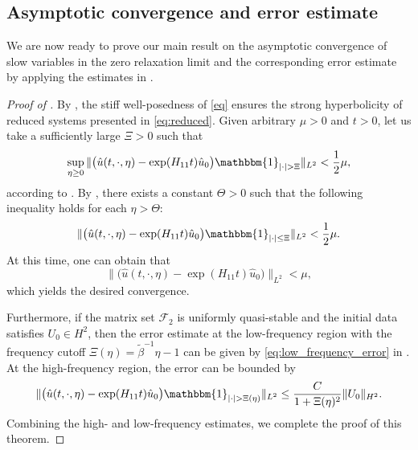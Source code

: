 \documentclass{article}
\theoremstyle{plain}%
\theoremstyle{definition}%
\theoremstyle{remark}%
\newcommand{\cF}{\mathcal{F}}
\newcommand{\+}[1]{{\bm{#1}}}
\newcommand{\norm}[1]{\|{#1}\|}
\begin{document}
\subsection{Asymptotic convergence and error estimate}
We are now ready to prove our main result on the asymptotic 
convergence of slow variables in the zero relaxation limit and the 
corresponding error estimate by applying the estimates in 
.

\begin{proof}[Proof of ]
  By , the stiff well-posedness of \cref{eq}
  ensures the strong hyperbolicity of reduced systems presented in 
  \cref{eq:reduced}.
  Given arbitrary $\mu > 0$ and $t > 0$, let us take a sufficiently 
  large $\Xi > 0$ such that 
  \begin{displaymath}
    \sup_{\eta \ge 0}
    \norm{ \big( \hat{u}(t, \cdot, \eta) - \exp(H_{11} t) \hat{u}_0
    \big) \mathbbm{1}_{|\cdot| > \Xi} }_{L^2} 
    < \frac{1}{2} \mu,
  \end{displaymath}
  according to . 
  By , there exists a constant 
  $\Theta > 0$ such that the following inequality holds for each 
  $\eta > \Theta$:
  \begin{displaymath}
    \norm{ \big( \hat{u}(t, \cdot, \eta) - \exp(H_{11} t) \hat{u}_0
    \big) \mathbbm{1}_{|\cdot| \le \Xi} }_{L^2} 
    < \frac{1}{2} \mu.
  \end{displaymath}
  At this time, one can obtain that 
  \begin{displaymath}
    \norm{ \big( \hat{u}(t, \cdot, \eta) - \exp(H_{11} t) \hat{u}_0
    \big) }_{L^2} < \mu,
  \end{displaymath}
  which yields the desired convergence.

  Furthermore, if the matrix set $\cF_2$ is uniformly quasi-stable 
  and the initial data satisfies $U_0 \in H^2$, then the 
  error estimate at the low-frequency region with the frequency 
  cutoff $\Xi(\eta) = \tilde{\beta}^{-1} \eta - 1$ can be given by 
  \cref{eq:low_frequency_error} in .
  At the high-frequency region, the error can be bounded by 
  \begin{displaymath}
    \norm{ \big( \hat{u}(t, \cdot, \eta) - \exp(H_{11} t) \hat{u}_0
    \big) \mathbbm{1}_{|\cdot| > \Xi(\eta)} }_{L^2} \le 
    \frac{C}{1 + \Xi(\eta)^2} \|U_0\|_{H^2}.
  \end{displaymath}
  Combining the high- and low-frequency estimates, we complete 
  the proof of this theorem.
\end{proof}
\end{document}
